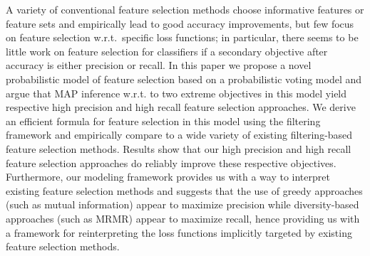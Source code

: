 A variety of conventional feature selection methods choose informative
features or feature sets and empirically lead to good accuracy
improvements, but few focus on feature selection w.r.t.\ specific loss
functions; in particular, there seems to be little work on feature
selection for classifiers if a secondary objective after accuracy is
either precision or recall.  In this paper we propose a novel
probabilistic model of feature selection based on a probabilistic
voting model and argue that MAP inference w.r.t. to two extreme
objectives in this model yield respective high precision and high
recall feature selection approaches.  We derive an efficient formula
for feature selection in this model using the filtering framework and
empirically compare to a wide variety of existing filtering-based
feature selection methods.  Results show that our high precision and
high recall feature selection approaches do reliably improve these
respective objectives.  Furthermore, our modeling framework provides
us with a way to interpret existing feature selection methods and
suggests that the use of greedy approaches (such as mutual
information) appear to maximize precision while diversity-based
approaches (such as MRMR) appear to maximize recall, hence providing
us with a framework for reinterpreting the loss functions implicitly
targeted by existing feature selection methods.

